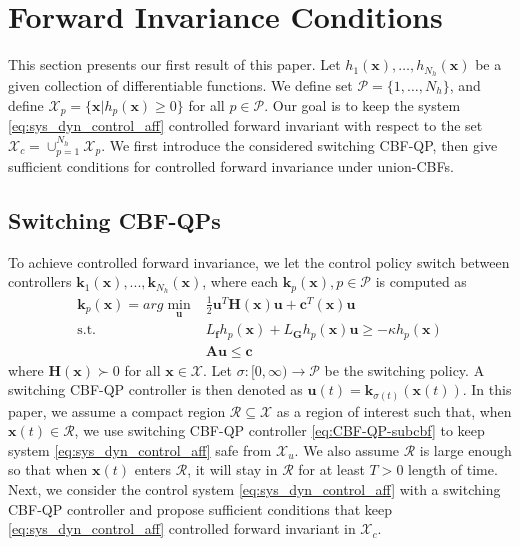 \documentclass[letterpaper, 10 pt, conference]{ieeeconf}  %
\begin{document}
\section{Forward Invariance Conditions}
\label{sec:fi_condition}

This section presents our first result of this paper. Let $h_1(\mathbf{x}),\dots,h_{N_h}(\mathbf{x})$ be a given collection of differentiable functions. We define set $\mathcal{P}=\{1,\dots,N_h\}$, and define $\mathcal{X}_p = \{\mathbf{x}|h_p(\mathbf{x})\geq 0\}$ for all $p\in\mathcal{P}$. Our goal is to keep the system \eqref{eq:sys_dyn_control_aff} controlled forward invariant with respect to the set $\mathcal{X}_c = \cup_{p=1}^{N_h} \mathcal{X}_p$. We first introduce the considered switching CBF-QP, then give sufficient conditions for controlled forward invariance under union-CBFs.  

\subsection{Switching CBF-QPs}
\label{sec:switching-cbf-qp}
To achieve controlled forward invariance, we let the control policy switch between controllers $\mathbf{k}_1(\mathbf{x}),...,\mathbf{k}_{N_h}(\mathbf{x})$, where each $\mathbf{k}_p(\mathbf{x}), p\in\mathcal{P}$ is computed as
\begin{subequations}
\label{eq:CBF-QP-subcbf}
\begin{align}
    \mathbf{k}_p(\mathbf{x}) = arg\min_{\mathbf{u}}& \frac{1}{2}\mathbf{u}^T\mathbf{H}(\mathbf{x})\mathbf{u} + \mathbf{c}^T(\mathbf{x})\mathbf{u}\\
    \text{s.t. }& L_{\mathbf{f}}h_p(\mathbf{x}) + L_{\mathbf{G}}h_p(\mathbf{x})\mathbf{u} \geq -\kappa h_p(\mathbf{x})\label{eq:CBF-QP-safety}\\
    & \mathbf{A}\mathbf{u}\leq\mathbf{c} \label{eq:CBF-QP-contollim}
\end{align}
\end{subequations}
where $\mathbf{H}(\mathbf{x})\succ 0$ for all $\mathbf{x}\in\mathcal{X}$. Let $\sigma:[0,\infty)\rightarrow\mathcal{P}$ be the switching policy. A switching CBF-QP controller is then denoted as $\mathbf{u}(t)=\mathbf{k}_{\sigma(t)}(\mathbf{x}(t))$. 
In this paper, we assume a compact region $\mathcal{R}\subseteq\mathcal{X}$ as a region of interest such that, when $\mathbf{x}(t)\in\mathcal{R}$, we use switching CBF-QP controller \eqref{eq:CBF-QP-subcbf} to keep system \eqref{eq:sys_dyn_control_aff} safe from $\mathcal{X}_u$. We also assume $\mathcal{R}$ is large enough so that when $\mathbf{x}(t)$ enters $\mathcal{R}$, it will stay in $\mathcal{R}$ for at least $T>0$ length of time. Next, we consider the control system \eqref{eq:sys_dyn_control_aff} with a switching CBF-QP controller and propose sufficient conditions that keep \eqref{eq:sys_dyn_control_aff} controlled forward invariant in $\mathcal{X}_c$. 
\end{document}
